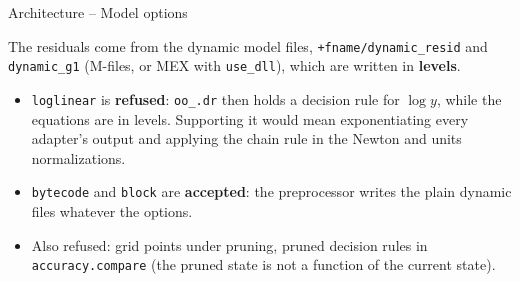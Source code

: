 \documentclass[11pt,aspectratio=169]{beamer}
\newcommand{\code}[1]{\texttt{#1}}
\begin{document}
\begin{frame}{Architecture -- Model options}

The residuals come from the dynamic model files, \code{+fname/dynamic\_resid} and \code{dynamic\_g1} (M-files, or MEX with \code{use\_dll}), which are written in \textbf{levels}.\newline

\begin{itemize}

\item \code{loglinear} is \textbf{refused}: \code{oo\_.dr} then holds a decision rule for $\log y$, while the equations are in levels. Supporting it would mean exponentiating every adapter's output and applying the chain rule in the Newton and units normalizations.\newline

\item \code{bytecode} and \code{block} are \textbf{accepted}: the preprocessor writes the plain dynamic files whatever the options.\newline

\item Also refused: grid points under pruning, pruned decision rules in \code{accuracy.compare} (the pruned state is not a function of the current state).

\end{itemize}

\end{frame}
\end{document}
